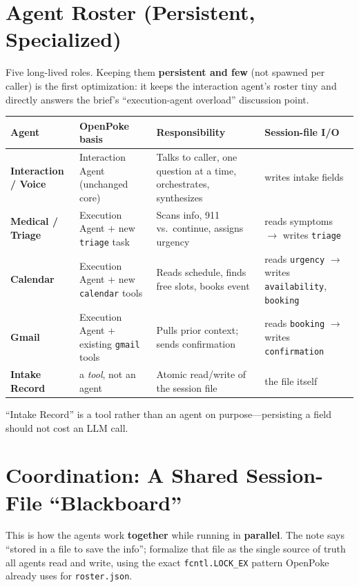 \documentclass[11pt,a4paper]{article}
\begin{document}
\section{Agent Roster (Persistent, Specialized)}

Five long-lived roles. Keeping them \textbf{persistent and few} (not spawned per caller) is the first
optimization: it keeps the interaction agent's roster tiny and directly answers the brief's
``execution-agent overload'' discussion point.

\begin{center}
\begin{longtable}{@{}p{2.5cm}p{2.7cm}p{4.0cm}p{3.1cm}@{}}
\toprule
\textbf{Agent} & \textbf{OpenPoke basis} & \textbf{Responsibility} & \textbf{Session-file I/O} \\
\midrule
\endhead
\textbf{Interaction / Voice} & Interaction Agent (unchanged core) & Talks to caller, one question at a time, orchestrates, synthesizes & writes intake fields \\
\textbf{Medical / Triage} & Execution Agent + new \texttt{triage} task & Scans info, 911 vs.\ continue, assigns urgency & reads symptoms $\rightarrow$ writes \texttt{triage} \\
\textbf{Calendar} & Execution Agent + new \texttt{calendar} tools & Reads schedule, finds free slots, books event & reads \texttt{urgency} $\rightarrow$ writes \texttt{availability}, \texttt{booking} \\
\textbf{Gmail} & Execution Agent + existing \texttt{gmail} tools & Pulls prior context; sends confirmation & reads \texttt{booking} $\rightarrow$ writes \texttt{confirmation} \\
\textbf{Intake Record} & a \emph{tool}, not an agent & Atomic read/write of the session file & the file itself \\
\bottomrule
\end{longtable}
\end{center}

\noindent ``Intake Record'' is a tool rather than an agent on purpose---persisting a field should not cost an
LLM call.

\section{Coordination: A Shared Session-File ``Blackboard''}

This is how the agents work \textbf{together} while running in \textbf{parallel}. The note says
``stored in a file to save the info''; formalize that file as the single source of truth all agents read and
write, using the exact \texttt{fcntl.LOCK\_EX} pattern OpenPoke already uses for \texttt{roster.json}.
\end{document}
